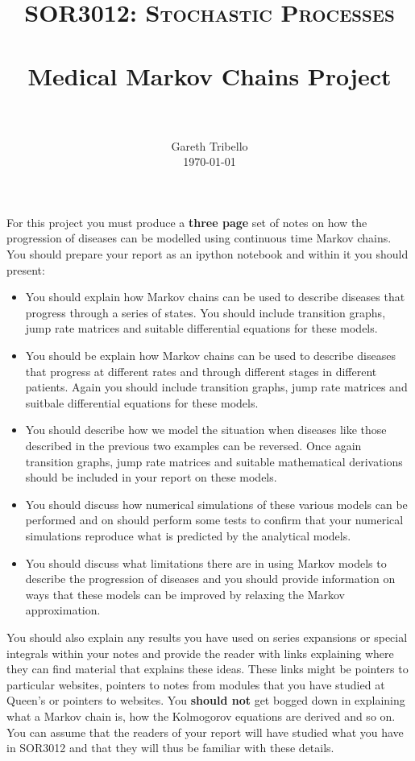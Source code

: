 \documentclass[paper=a4, fontsize=11pt]{scrartcl}
\title{\usefont{OT1}{bch}{b}{n} \normalfont \normalsize \textsc{SOR3012:
Stochastic Processes} \\ [25pt] \horrule{0.5pt} \\[0.4cm] 
\huge Medical Markov Chains Project \\
\horrule{2pt} \\[0.25cm]
}
\author{ \normalfont
\normalsize
        Gareth Tribello \\[-3pt] \normalsize
        \today
}
\date{}
\numberwithin{equation}{section}
\numberwithin{figure}{section}
\numberwithin{table}{section}
\begin{document}
\maketitle

For this project you must produce a {\bf three page} set of notes on how the progression of diseases can be modelled using continuous time Markov chains.  You should prepare your report as an 
ipython notebook and within it you should present:

\begin{itemize}
 \item You should explain how Markov chains can be used to describe diseases that progress through a series of states. You should include transition graphs, jump rate matrices and suitable 
 differential equations for these models.
 
 \item You should be explain how Markov chains can be used to describe diseases that progress at different rates and through different stages in different patients.  Again you should include transition graphs, jump rate matrices and suitbale differential equations for these models.

 \item You should describe how we model the situation when diseases like those described in the previous two examples can be reversed.  Once again transition graphs, jump rate matrices and suitable mathematical derivations should be included in your report on these models.

\item You should discuss how numerical simulations of these various models can be performed and on should perform some tests to confirm that your numerical simulations reproduce what is predicted by the analytical models.

 \item You should discuss what limitations there are in using Markov models to describe the progression of diseases and you should provide information on ways that these models can be improved by relaxing the Markov approximation.
\end{itemize}

You should also explain any results you have used on series expansions or special integrals within your notes and provide the reader with links explaining where they can find material that explains 
these ideas.  These links might be pointers to particular websites, pointers to notes from modules that you have studied at Queen's or pointers to websites.  You {\bf should not} get bogged down in 
explaining what a Markov chain is, how the Kolmogorov equations are derived and so on. You can assume that the readers of your report will have studied what you have in SOR3012 and that they will thus
be familiar with these details.
\end{document}
